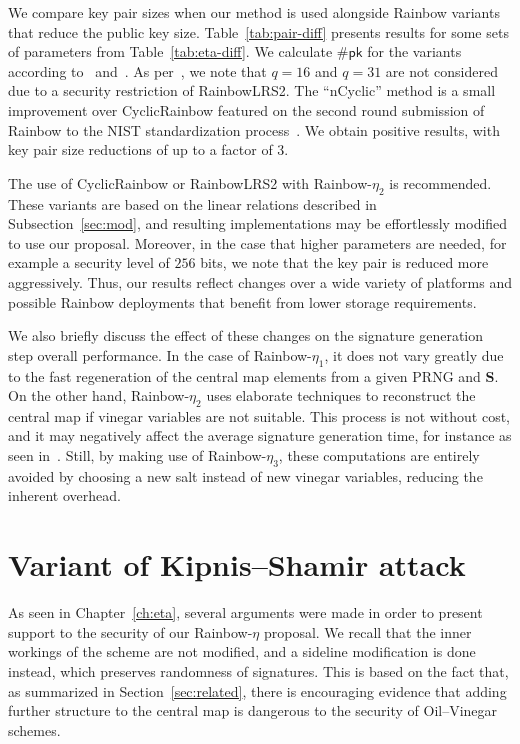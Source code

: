 \documentclass[12pt, a4paper, oneside]{memoir}
\theoremstyle{definition}
\begin{document}
We compare key pair sizes when our method is used alongside Rainbow variants that reduce the public key size. Table~\ref{tab:pair-diff} presents results for some sets of parameters from Table~\ref{tab:eta-diff}. We calculate $\#\mathsf{pk}$ for the variants according to~\cite[Eqs.~9.2,~9.4]{Petzoldt:201307} and~\cite{Petzoldt:202004}. As per~\cite[Remark 9.1]{Petzoldt:201307}, we note that $q = 16$ and $q = 31$ are not considered due to a security restriction of RainbowLRS2. The ``nCyclic'' method is a small improvement over CyclicRainbow featured on the second round submission of Rainbow to the NIST standardization process~\cite{Ding:201901}. We obtain positive results, with key pair size reductions of up to a factor of 3.

The use of CyclicRainbow or RainbowLRS2 with Rainbow-$\eta_{2}$ is recommended. These variants are based on the linear relations described in Subsection~\ref{sec:mod}, and resulting implementations may be effortlessly modified to use our proposal. Moreover, in the case that higher parameters are needed, for example a security level of $256$ bits, we note that the key pair is reduced more aggressively. Thus, our results reflect changes over a wide variety of platforms and possible Rainbow deployments that benefit from lower storage requirements.

We also briefly discuss the effect of these changes on the signature generation step overall performance. In the case of Rainbow-$\eta_{1}$, it does not vary greatly due to the fast regeneration of the central map elements from a given PRNG and $\mathbf{S}$. On the other hand, Rainbow-$\eta_{2}$ uses elaborate techniques to reconstruct the central map if vinegar variables are not suitable. This process is not without cost, and it may negatively affect the average signature generation time, for instance as seen in~\cite{Petzoldt:202004}. Still, by making use of Rainbow-$\eta_{3}$, these computations are entirely avoided by choosing a new salt instead of new vinegar variables, reducing the inherent overhead.

\chapter{Variant of Kipnis--Shamir attack}\label{ch:attack}

As seen in Chapter~\ref{ch:eta}, several arguments were made in order to present support to the security of our Rainbow-$\eta$ proposal. We recall that the inner workings of the scheme are not modified, and a sideline modification is done instead, which preserves randomness of signatures. This is based on the fact that, as summarized in Section~\ref{sec:related}, there is encouraging evidence that adding further structure to the central map is dangerous to the security of Oil--Vinegar schemes. 
\end{document}
